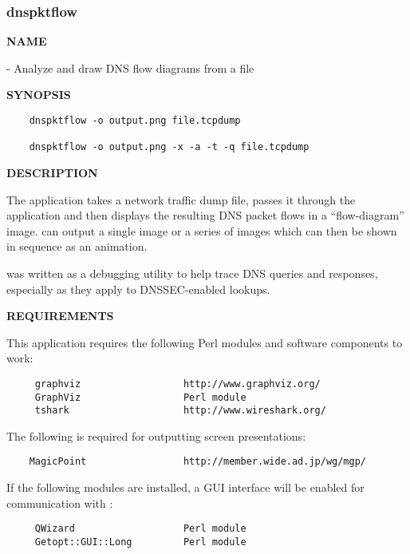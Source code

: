 \clearpage

\subsubsection{dnspktflow}

{\bf NAME}

 - Analyze and draw DNS flow diagrams from a  file

{\bf SYNOPSIS}

\begin{verbatim}
    dnspktflow -o output.png file.tcpdump

    dnspktflow -o output.png -x -a -t -q file.tcpdump
\end{verbatim}

{\bf DESCRIPTION}

The  application takes a  network traffic dump
file, passes it through the  application and then displays the
resulting DNS packet flows in a ``flow-diagram'' image.  
can output a single image or a series of images which can then be
shown in sequence as an animation.

 was written as a debugging utility to help trace DNS
queries and responses, especially as they apply to DNSSEC-enabled lookups.

{\bf REQUIREMENTS}

This application requires the following Perl modules and software
components to work:

\begin{verbatim}
     graphviz                  http://www.graphviz.org/
     GraphViz                  Perl module
     tshark                    http://www.wireshark.org/
\end{verbatim}

The following is required for outputting screen presentations:

\begin{verbatim}
    MagicPoint                 http://member.wide.ad.jp/wg/mgp/
\end{verbatim}

If the following modules are installed, a GUI interface will be enabled for
communication with :

\begin{verbatim}
     QWizard                   Perl module
     Getopt::GUI::Long         Perl module
\end{verbatim}

